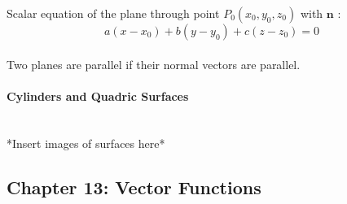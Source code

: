 \documentclass{article}
\begin{document}
Scalar equation of the plane through point \(P_0(x_0, y_0, z_0)\) with \(\mathbf{n}\) :\\
\begin{equation}
    a(x-x_0) + b(y-y_0) + c(z-z_0) = 0
\end{equation}\\

Two planes are parallel if their normal vectors are parallel.\\

\paragraph{Cylinders and Quadric Surfaces}\mbox{}\\
*Insert images of surfaces here*\\


\subsection*{Chapter 13: Vector Functions}
\end{document}
